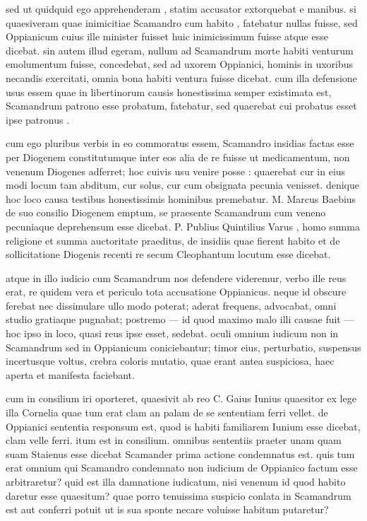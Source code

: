  sed ut quidquid ego apprehenderam , statim accusator extorquebat e manibus. si quaesiveram quae inimicitiae Scamandro cum habito , fatebatur nullas fuisse, sed Oppianicum cuius ille minister fuisset huic inimicissimum fuisse atque esse dicebat. sin autem illud egeram, nullum ad Scamandrum morte habiti venturum emolumentum fuisse, concedebat, sed ad uxorem Oppianici, hominis in uxoribus necandis exercitati, omnia bona habiti ventura fuisse dicebat. cum illa defensione usus essem quae in libertinorum causis honestissima semper existimata est, Scamandrum patrono esse probatum, fatebatur, sed quaerebat cui probatus esset ipse patronus .

 cum ego pluribus verbis in eo commoratus essem, Scamandro insidias factas esse per Diogenem constitutumque inter eos alia de re fuisse ut medicamentum, non venenum Diogenes adferret; hoc cuivis usu venire posse : quaerebat cur in eius modi locum tam abditum, cur solus, cur cum obsignata pecunia venisset. denique hoc loco causa testibus honestissimis hominibus premebatur. M. Marcus Baebius de suo consilio Diogenem emptum, se praesente Scamandrum cum veneno pecuniaque deprehensum esse dicebat. P. Publius Quintilius Varus , homo summa religione et summa auctoritate praeditus, de insidiis quae fierent habito et de sollicitatione Diogenis recenti re secum Cleophantum locutum esse dicebat.

 atque in illo iudicio cum Scamandrum nos defendere videremur, verbo ille reus erat, re quidem vera et periculo tota accusatione Oppianicus. neque id obscure ferebat nec dissimulare ullo modo poterat; aderat frequens, advocabat, omni studio gratiaque pugnabat; postremo — id quod maximo malo illi causae fuit — hoc ipso in loco, quasi reus ipse esset, sedebat. oculi omnium iudicum non in Scamandrum sed in Oppianicum coniciebantur; timor eius, perturbatio, suspensus incertusque voltus, crebra coloris mutatio, quae erant antea suspiciosa, haec aperta et manifesta faciebant.

 cum in consilium iri oporteret, quaesivit ab reo C. Gaius Iunius quaesitor ex lege illa Cornelia quae tum erat clam an palam de se sententiam ferri vellet. de Oppianici sententia responsum est, quod is habiti familiarem Iunium esse dicebat, clam velle ferri. itum est in consilium. omnibus sententiis praeter unam quam suam Staienus esse dicebat Scamander prima actione condemnatus est. quis tum erat omnium qui Scamandro condemnato non iudicium de Oppianico factum esse arbitraretur? quid est illa damnatione iudicatum, nisi venenum id quod habito daretur esse quaesitum? quae porro tenuissima suspicio conlata in Scamandrum est aut conferri potuit ut is sua sponte necare voluisse habitum putaretur?

